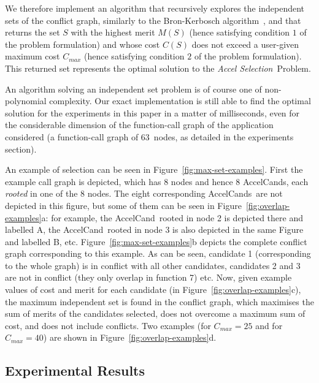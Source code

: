 \documentclass[]{usiinfthesis}
\newcommand{\candidate}{{AccelCand}}
\newcommand{\candidates}{{AccelCand}s}
\newcommand{\probname}{\emph{Accel Selection}}
\newcommand{\numberOfcandidates}{{63}}
\begin{document}
We therefore implement an algorithm that recursively explores the
independent sets of the conflict graph, similarly to the Bron-Kerbosch
algorithm~\cite{BronKerbosch73}, and that returns the set $S$ with the
highest merit $M(S)$ (hence satisfying condition $1$ of the problem
formulation) and whose cost $C(S)$ does not exceed a user-given
maximum cost $C_{max}$ (hence satisfying condition $2$ of the
problem formulation).  
This returned set represents the optimal
solution to the \probname\ Problem.

An algorithm solving an independent set problem is of course one of
non-polynomial complexity. Our exact implementation is still able to
find the optimal solution for the experiments in this paper in a
matter of milliseconds, even for the considerable dimension of the
function-call graph of the application considered (a function-call
graph of \numberOfcandidates\ nodes, as detailed in the experiments section). 

An example of selection can be seen in
Figure~\ref{fig:max-set-examples}. First the example call graph is
depicted, which has 8 nodes and hence 8 \candidates, each
\emph{rooted} in one of the 8 nodes. The eight corresponding
\candidates\ are not depicted in this figure, but some of them can be
seen in Figure~\ref{fig:overlap-examples}a: for example, the
\candidate\ rooted in node 2 is depicted there and labelled A, the
\candidate\ rooted in node 3 is also depicted in the same Figure and
labelled B, etc.  Figure~\ref{fig:max-set-examples}b depicts the
complete conflict graph corresponding to this example. As can be seen,
candidate 1 (corresponding to the whole graph) is in conflict with all
other candidates, candidates 2 and 3 are not in conflict (they only
overlap in function 7) etc. Now, given example values of cost and
merit for each candidate (in Figure~\ref{fig:overlap-examples}c), the
maximum independent set is found in the conflict graph, which
maximises the sum of merits of the candidates selected, does not
overcome a maximum sum of cost, and does not include conflicts. Two
examples (for $C_{max} = 25$ and for $C_{max} = 40$) are shown in
Figure~\ref{fig:overlap-examples}d.



\subsection{Experimental Results}
\label{sec:results_as}
\end{document}

